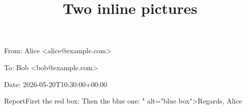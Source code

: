 \documentclass[11pt,a4paper]{article}
\title{Two inline pictures}
\begin{document}
\maketitle

From: Alice <alice@example.com>

To: Bob <bob@example.com>

Date: 2026-05-20T10:30:00+00:00

ReportFirst the red box:
Then the blue one:
" alt="blue box">Regards, Alice
\end{document}
